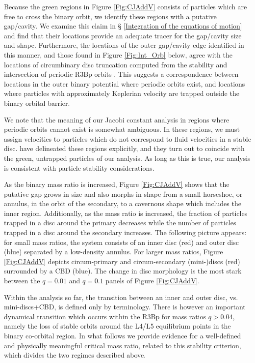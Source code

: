 \documentclass[usenatbib]{mnras}
\begin{document}
Because the green regions in Figure \ref{Fig:CJAddV} consists of
particles which are free to cross the binary orbit, we identify these
regions with a putative gap/cavity. We examine this claim in \S
\ref{Integration of the equations of motion} and find that their
locations provide an adequate tracer for the gap/cavity size and shape. 
Furthermore, the locations of the outer gap/cavity edge identified in this manner, and those 
found in Figure \ref{Fig:Int_Orb} below, agree with the 
locations of circumbinary disc truncation computed from the stability 
and intersection of periodic R3Bp orbits \citep{RP:Excretion:1981}. This suggests a correspondence between locations in the outer binary potential where periodic orbits exist, and locations where particles with approximately Keplerian velocity are trapped outside the binary orbital barrier.



We note that the meaning of our Jacobi constant analysis in regions where periodic orbits cannot exist is somewhat ambiguous. In these regions, we must assign velocities to particles which do not correspond to fluid velocities in a stable disc.  \cite{RP:Excretion:1981} have delineated these regions explicitly, and they turn out to coincide with the green, untrapped particles of our analysis. As long as this is true, our analysis is consistent with particle stability considerations.




As the binary mass ratio is increased, Figure
\ref{Fig:CJAddV} shows that the putative gap grows in size and also
morphs in shape from a small horseshoe, or annulus, in the orbit of
the secondary, to a cavernous shape which includes the inner
region. Additionally, as the mass ratio is increased, the fraction of
particles trapped in a disc around the primary decreases while the
number of particles trapped in a disc around the secondary
increases. The following picture appears: for small mass ratios, the
system consists of an inner disc (red) and outer disc (blue) separated
by a low-density annulus. For larger mass ratios, Figure
\ref{Fig:CJAddV} depicts circum-primary and circum-secondary
(mini-)discs (red) surrounded by a CBD (blue). The change in
disc morphology is the most stark between the $q=0.01$ and $q=0.1$
panels of Figure \ref{Fig:CJAddV}.

Within the analysis so far, the transition between an inner and outer
disc, vs. mini-discs+CBD, is defined only by terminology. There is
however an important dynamical transition which occurs within the R3Bp
for mass ratios $q> 0.04$, namely the loss of stable orbits around the
L4/L5 equilibrium points in the binary co-orbital region. In what
follows we provide evidence for a well-defined and physically
meaningful critical mass ratio, related to this stability criterion,
which divides the two regimes described above.
\end{document}
